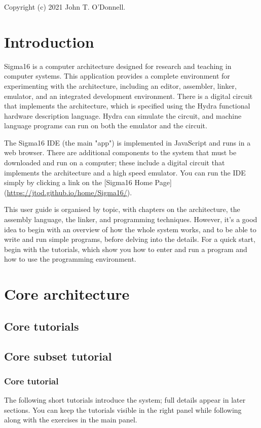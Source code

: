 \documentclass[11pt]{article}
\date{\today}
\title{}
\begin{document}
Copyright (c) 2021 John T. O'Donnell.

\setcounter{tocdepth}{3}
\tableofcontents

\section*{Introduction}
\label{sec:org1179e1c}

Sigma16 is a computer architecture designed for research and teaching
in computer systems.  This application provides a complete environment
for experimenting with the architecture, including an editor,
assembler, linker, emulator, and an integrated development
environment.  There is a digital circuit that implements the
architecture, which is specified using the Hydra functional hardware
description language.  Hydra can simulate the circuit, and machine
language programs can run on both the emulator and the circuit.

The Sigma16 IDE (the main "app") is implemented in JavaScript and runs
in a web browser.  There are additional components to the system that
must be downloaded and run on a computer; these include a digital
circuit that implements the architecture and a high speed emulator.
You can run the IDE simply by clicking a link on the [Sigma16 Home
Page](\url{https://jtod.github.io/home/Sigma16/}).

This user guide is organised by topic, with chapters on the
architecture, the assembly language, the linker, and programming
techniques.  However, it's a good idea to begin with an overview of
how the whole system works, and to be able to write and run simple
programs, before delving into the details.  For a quick start, begin
with the tutorials, which show you how to enter and run a program and
how to use the programming environment.

\section*{Core architecture}
\label{sec:org7075974}
\subsection*{Core tutorials}
\label{sec:orgae20c2b}
\subsection*{Core subset tutorial}
\label{sec:org19ce49b}
\subsubsection*{Core tutorial}
\label{sec:orgdcb8c97}
The following short tutorials introduce the system; full details
appear in later sections.  You can keep the tutorials visible in the
right panel while following along with the exercises in the main
panel.
\end{document}
